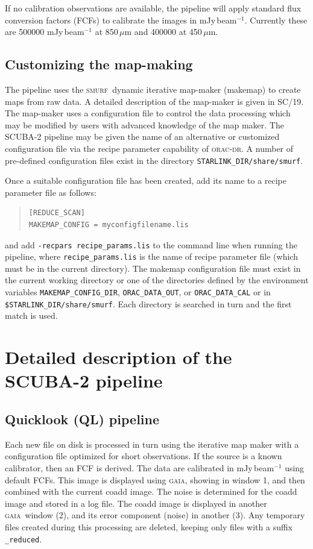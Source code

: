 \documentclass[twoside,11pt]{article}
\newcommand{\xref}[3]{#1}
\newcommand{\xlabel}[1]{}
\renewcommand{\_}{\texttt{\symbol{95}}}
\newenvironment{myquote}{\begin{quote}\begin{small}}{\end{small}\end{quote}}
\newcommand{\GAIA}{\textsc{gaia}}
\newcommand{\SMURF}{\textsc{smurf}}
\newcommand{\SMURFcook}{\xref{SC/19}{sc19}{}}
\newcommand{\oracdr}{\textsc{orac-dr}}
\newcommand{\task}[1]{\textsf{#1}}
\newcommand{\makemap}{\xref{\task{makemap}}{sun258}{MAKEMAP}}
\begin{document}
If no calibration observations are available, the pipeline will apply
standard flux conversion factors (FCFs) to calibrate the images in
mJy\,beam$^{-1}$. Currently these are 500000 mJy\,beam$^{-1}$ at
850\,$\mu$m and 400000 at 450\,$\mu$m.

\subsection{Customizing the map-making}

The pipeline uses the \SMURF\ dynamic iterative map-maker (\makemap)
to create maps from raw data. A detailed description of the map-maker
is given in \SMURFcook. The map-maker uses a configuration file to
control the data processing which may be modified by users with
advanced knowledge of the map maker. The SCUBA-2 pipeline may be given
the name of an alternative or customized configuration file via the
recipe parameter capability of \oracdr. A number of pre-defined
configuration files exist in the directory
\verb+STARLINK_DIR/share/smurf+.

Once a suitable configuration file has been created, add its name to a
recipe parameter file as follows:
\begin{myquote}
\begin{verbatim}
[REDUCE_SCAN]
MAKEMAP_CONFIG = myconfigfilename.lis
\end{verbatim}
\end{myquote}
and add \verb+-recpars recipe_params.lis+ to the command line when
running the pipeline, where \verb+recipe_params.lis+ is the name of
recipe parameter file (which must be in the current directory). The
\task{makemap} configuration file must exist in the current working
directory or one of the directories defined by the environment
variables \verb+MAKEMAP_CONFIG_DIR+, \verb+ORAC_DATA_OUT+, or
\verb+ORAC_DATA_CAL+ or in \verb+$STARLINK_DIR/share/smurf+. Each
directory is searched in turn and the first match is used.

\section{\xlabel{details}Detailed description of the SCUBA-2 pipeline\label{se:details}}

\subsection{Quicklook (QL) pipeline}

Each new file on disk is processed in turn using the iterative map
maker with a configuration file optimized for short observations. If
the source is a known calibrator, then an FCF is derived. The data are
calibrated in mJy\,beam$^{-1}$ using default FCFs. This image is
displayed using \GAIA, showing in window 1, and then combined with the
current coadd image. The noise is determined for the coadd image and
stored in a log file. The coadd image is displayed in another
\GAIA\ window (2), and its error component (noise) in another (3). Any
temporary files created during this processing are deleted, keeping
only files with a suffix \verb+_reduced+.
\end{document}
